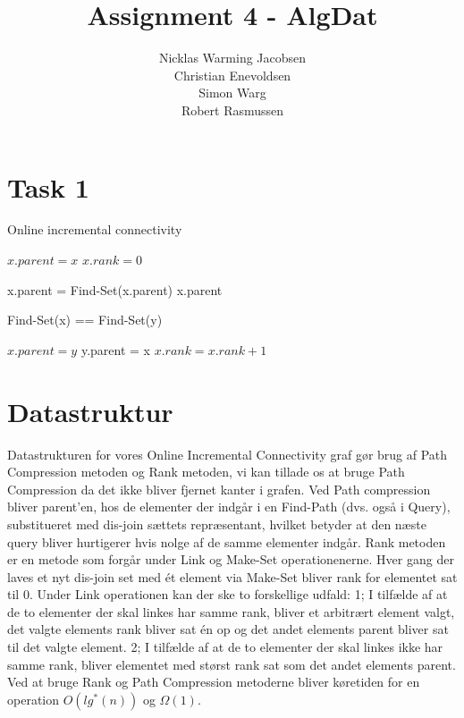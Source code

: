 \documentclass[12pt]{article}
\title{Assignment 4 - AlgDat}
\author{Nicklas Warming Jacobsen \\Christian Enevoldsen\\Simon Warg \\Robert Rasmussen}
\begin{document}
\maketitle

\section*{Task 1}
\begin{algorithm}
 \caption{Online incremental connectivity}
 \begin{algorithmic}
        \State  {}
        \State $x.parent = x$
        \State $x.rank = 0$
        \EndFunction

        \State{}
                \State x.parent = Find-Set(x.parent)
        \EndIf
        \State \Return x.parent
        \EndFunction

        \State {}
        \State \Return Find-Set(x) == Find-Set(y)
        \EndFunction

        \State {}
                \State $x.parent = y$
        \Else
                \State y.parent = x
                        \State $x.rank = x.rank + 1$
                \EndIf
        \EndIf
        \EndFunction

\end{algorithmic}
\end{algorithm}

\section*{Datastruktur}
Datastrukturen for vores Online Incremental Connectivity graf gør brug af Path Compression metoden og Rank metoden, vi kan tillade os at bruge Path Compression  da det ikke bliver fjernet kanter i grafen. Ved Path compression bliver parent'en, hos de elementer der indgår i en Find-Path (dvs. også i Query), substitueret med dis-join sættets repræsentant, hvilket betyder at den næste query bliver hurtigerer hvis nolge af de samme elementer indgår. Rank metoden er en metode som forgår under Link og Make-Set operationenerne. Hver gang der laves et nyt dis-join set med ét element via Make-Set bliver rank for elementet sat til 0. Under Link operationen kan der ske to forskellige udfald: 1; I tilfælde af at de to elementer der skal linkes har samme rank, bliver et arbitrært element valgt, det valgte elements rank bliver sat én op og det andet elements parent bliver sat til det valgte element. 2; I tilfælde af at de to elementer der skal linkes ikke har samme rank, bliver elementet med størst rank sat som det andet elements parent.
Ved at bruge Rank og Path Compression metoderne bliver køretiden for en operation $O(lg^*(n))$ og $\Omega(1)$.
\newpage
\end{document}
